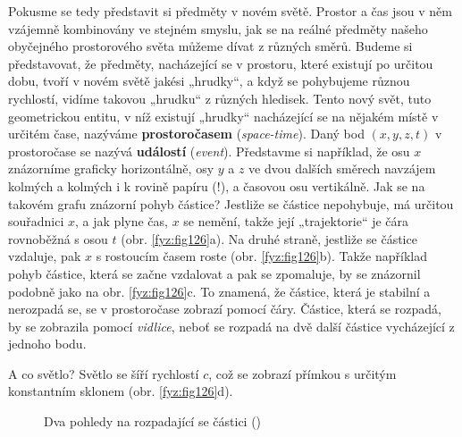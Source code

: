     Pokusme se tedy představit si předměty v novém světě. Prostor a čas jsou v něm vzájemně 
    kombinovány ve stejném smyslu, jak se na reálné předměty našeho obyčejného prostorového světa 
    můžeme dívat z různých směrů. Budeme si představovat, že předměty, nacházející se v prostoru, 
    které existují po určitou dobu, tvoří v novém světě jakési „hrudky“, a když se pohybujeme 
    různou rychlostí, vidíme takovou „hrudku“ z různých hledisek. Tento nový svět, tuto 
    geometrickou entitu, v níž existují „hrudky“ nacházející se na nějakém místě v určitém čase, 
    nazýváme \textbf{prostoročasem} (\emph{space-time}). Daný bod \((x, y, z, t)\) v prostoročase 
    se nazývá \textbf{událostí} (\emph{event}). Představme si například, že osu \(x\) znázorníme 
    graficky horizontálně, osy \(y\) a \(z\) ve dvou dalších směrech navzájem kolmých a kolmých i k 
    rovině papíru (!), a časovou osu vertikálně. Jak se na takovém grafu znázorní pohyb částice? 
    Jestliže se částice nepohybuje, má určitou souřadnici \(x\), a jak plyne čas, \(x\) se nemění, 
    takže její „trajektorie“ je čára rovnoběžná s osou \(t\) (obr. \ref{fyz:fig126}a). Na druhé 
    straně, jestliže se částice vzdaluje, pak \(x\) s rostoucím časem roste (obr. 
    \ref{fyz:fig126}b). Takže například pohyb částice, která se začne vzdalovat a pak se zpomaluje, 
    by se znázornil podobně jako na obr. \ref{fyz:fig126}c. To znamená, že částice, která je 
    stabilní a nerozpadá se, se v prostoročase zobrazí pomocí čáry. Částice, která se rozpadá, by 
    se zobrazila pomocí \emph{vidlice}, neboť se rozpadá na dvě další částice vycházející z jednoho 
    bodu.
    
    A co světlo? Světlo se šíří rychlostí \(c\), což se zobrazí přímkou s určitým konstantním 
    sklonem (obr. \ref{fyz:fig126}d).
    
    \begin{figure}[ht!]  %
      \centering
      \caption{Dva pohledy na rozpadající se částici (\cite[s.~239]{Feynman01})}
      \label{fyz:fig127}
    \end{figure}
    
